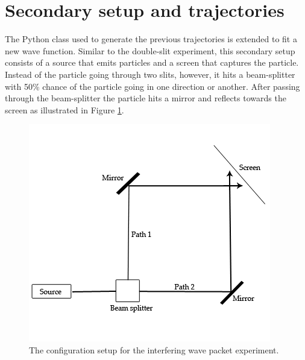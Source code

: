 \documentclass[10pt, reqno]{article}
\begin{document}
\section{Secondary setup and trajectories}

  The Python class used to generate the previous trajectories is extended to fit a new wave function.
  Similar to the double-slit experiment, this secondary setup consists of a source that emits particles and a screen that captures the particle.
  Instead of the particle going through two slits, however, it hits a beam-splitter with 50\% chance of the particle going
    in one direction or another.
  After passing through the beam-splitter the particle hits a mirror and reflects towards the screen as illustrated in Figure \ref{fig:interfering-setup}.

  \begin{figure}[!ht]
    \centerline{\includegraphics[scale=.6]{./imgs/secondary-setup.png}}
    \caption{
      The configuration setup for the interfering wave packet experiment.
    }
    \label{fig:interfering-setup}
  \end{figure}
\end{document}
